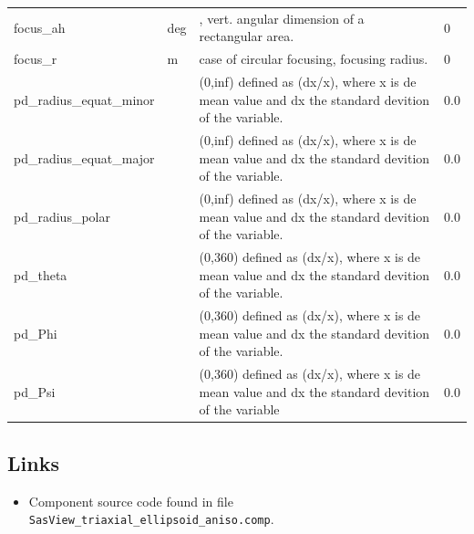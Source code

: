 \begin{longtable}{p{}p{}p{}p{}}
focus\_ah & deg & , vert. angular dimension of a rectangular area. & 0 \\
focus\_r & m & case of circular focusing, focusing radius. & 0 \\
pd\_radius\_equat\_minor &  & (0,inf) defined as (dx/x), where x is de mean value and dx the standard devition of the variable. & 0.0 \\
pd\_radius\_equat\_major &  & (0,inf) defined as (dx/x), where x is de mean value and dx the standard devition of the variable. & 0.0 \\
pd\_radius\_polar &  & (0,inf) defined as (dx/x), where x is de mean value and dx the standard devition of the variable. & 0.0 \\
pd\_theta &  & (0,360) defined as (dx/x), where x is de mean value and dx the standard devition of the variable. & 0.0 \\
pd\_Phi &  & (0,360) defined as (dx/x), where x is de mean value and dx the standard devition of the variable. & 0.0 \\
pd\_Psi &  & (0,360) defined as (dx/x), where x is de mean value and dx the standard devition of the variable & 0.0 \\
\bottomrule
\end{longtable}

\subsection*{Links}
\begin{itemize}
  \item Component source code found in file \texttt{SasView\_triaxial\_ellipsoid\_aniso.comp}.
\end{itemize}
